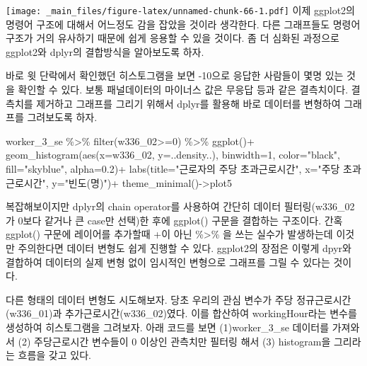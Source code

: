 \documentclass[
]{book}
\newenvironment{Shaded}{\begin{snugshade}}{\end{snugshade}}
\newcommand{\AttributeTok}[1]{\textcolor[rgb]{0.77,0.63,0.00}{#1}}
\newcommand{\DecValTok}[1]{\textcolor[rgb]{0.00,0.00,0.81}{#1}}
\newcommand{\FloatTok}[1]{\textcolor[rgb]{0.00,0.00,0.81}{#1}}
\newcommand{\FunctionTok}[1]{\textcolor[rgb]{0.00,0.00,0.00}{#1}}
\newcommand{\NormalTok}[1]{#1}
\newcommand{\OtherTok}[1]{\textcolor[rgb]{0.56,0.35,0.01}{#1}}
\newcommand{\SpecialCharTok}[1]{\textcolor[rgb]{0.00,0.00,0.00}{#1}}
\newcommand{\StringTok}[1]{\textcolor[rgb]{0.31,0.60,0.02}{#1}}
\theoremstyle{definition}
\theoremstyle{definition}
\theoremstyle{definition}
\theoremstyle{definition}
\theoremstyle{remark}
\begin{document}
\texttt{[image: \_main\_files/figure-latex/unnamed-chunk-66-1.pdf]}
이제 ggplot2의 명령어 구조에 대해서 어느정도 감을 잡았을 것이라 생각한다. 다른 그래프들도 명령어 구조가 거의 유사하기 때문에 쉽게 응용할 수 있을 것이다. 좀 더 심화된 과정으로 ggplot2와 dplyr의 결합방식을 알아보도록 하자.

바로 윗 단락에서 확인했던 히스토그램을 보면 -10으로 응답한 사람들이 몇명 있는 것을 확인할 수 있다. 보통 패널데이터의 마이너스 값은 무응답 등과 같은 결측치이다. 결측치를 제거하고 그래프를 그리기 위해서 dplyr를 활용해 바로 데이터를 변형하여 그래프를 그려보도록 하자.

\begin{Shaded}
\begin{Highlighting}[]
\NormalTok{worker\_3\_se }\SpecialCharTok{\%\textgreater{}\%} 
  \FunctionTok{filter}\NormalTok{(w336\_02}\SpecialCharTok{\textgreater{}=}\DecValTok{0}\NormalTok{) }\SpecialCharTok{\%\textgreater{}\%} 
  \FunctionTok{ggplot}\NormalTok{()}\SpecialCharTok{+}
  \FunctionTok{geom\_histogram}\NormalTok{(}\FunctionTok{aes}\NormalTok{(}\AttributeTok{x=}\NormalTok{w336\_02, }\AttributeTok{y=}\NormalTok{..density..), }\AttributeTok{binwidth=}\DecValTok{1}\NormalTok{, }\AttributeTok{color=}\StringTok{"black"}\NormalTok{, }\AttributeTok{fill=}\StringTok{"skyblue"}\NormalTok{, }\AttributeTok{alpha=}\FloatTok{0.2}\NormalTok{)}\SpecialCharTok{+}
  \FunctionTok{labs}\NormalTok{(}\AttributeTok{title=}\StringTok{"근로자의 주당 초과근로시간"}\NormalTok{, }\AttributeTok{x=}\StringTok{"주당 초과근로시간"}\NormalTok{, }\AttributeTok{y=}\StringTok{"빈도(명)"}\NormalTok{)}\SpecialCharTok{+}
  \FunctionTok{theme\_minimal}\NormalTok{()}\OtherTok{{-}\textgreater{}}\NormalTok{plot5}
\end{Highlighting}
\end{Shaded}

복잡해보이지만 dplyr의 chain operator를 사용하여 간단히 데이터 필터링(w336\_02가 0보다 같거나 큰 case만 선택)한 후에 ggplot() 구문을 결합하는 구조이다. 간혹 ggplot() 구문에 레이어를 추가할때 +이 아닌 \%\textgreater\% 을 쓰는 실수가 발생하는데 이것만 주의한다면 데이터 변형도 쉽게 진행할 수 있다. ggplot2의 장점은 이렇게 dpyr와 결합하여 데이터의 실제 변형 없이 임시적인 변형으로 그래프를 그릴 수 있다는 것이다.

다른 형태의 데이터 변형도 시도해보자. 당초 우리의 관심 변수가 주당 정규근로시간(w336\_01)과 추가근로시간(w336\_02)였다. 이를 합산하여 workingHour라는 변수를 생성하여 히스토그램을 그려보자. 아래 코드를 보면 (1)worker\_3\_se 데이터를 가져와서 (2) 주당근로시간 변수들이 0 이상인 관측치만 필터링 해서 (3) histogram을 그리라는 흐름을 갖고 있다.
\end{document}
